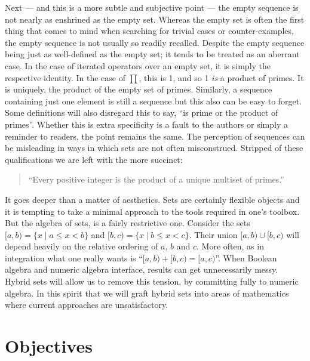 Next --- and this is a more subtle and subjective point --- 
the empty sequence is not nearly as enshrined as the empty set.
Whereas the empty set is often the first thing that comes to mind when searching for trivial cases or counter-examples,
the empty sequence is not usually so readily recalled.
Despite the empty sequence being just as well-defined as the empty set; it tends to be treated as an aberrant case.
In the case of iterated operators over an empty set, it is simply the respective identity.
In the case of $\prod$, this is 1, and so 1 \emph{is} a product of primes.
It is uniquely, the product of the empty set of primes.
Similarly, a sequence containing just one element is still a sequence but this also can be easy to forget.
Some definitions will also disregard this to say, ``is prime or the product of primes''. 
Whether this is extra specificity is a fault to the authors or simply a reminder to readers, the point remains the same.
The perception of sequences can be misleading in ways in which sets are not often misconstrued.
Stripped of these qualifications we are left with the more succinct:
\begin{quote}
	``Every positive integer is the product of a unique multiset of primes.''
\end{quote}


It goes deeper than a matter of aesthetics. 
Sets are certainly flexible objects and it is tempting to take a minimal approach to the tools required in one's toolbox.
But the algebra of sets, is a fairly restrictive one.
Consider the sets $[a,b) = \{ x \; |\; a \leq x < b \}$ and $[b,c) = \{ x \;|\: b \leq x < c \}$.
Their union $[a,b) \cup [b,c)$ will depend heavily on the relative ordering of $a$, $b$ and $c$. 
More often, as in integration what one really wants is ``$[a,b) + [b,c) = [a,c)$''.
When Boolean algebra and numeric algebra interface, results can get unnecessarily messy.
Hybrid sets will allow us to remove this tension, by committing fully to numeric algebra.
In this spirit that we will graft hybrid sets into areas of mathematics where current approaches are unsatisfactory.





\section{Objectives}


